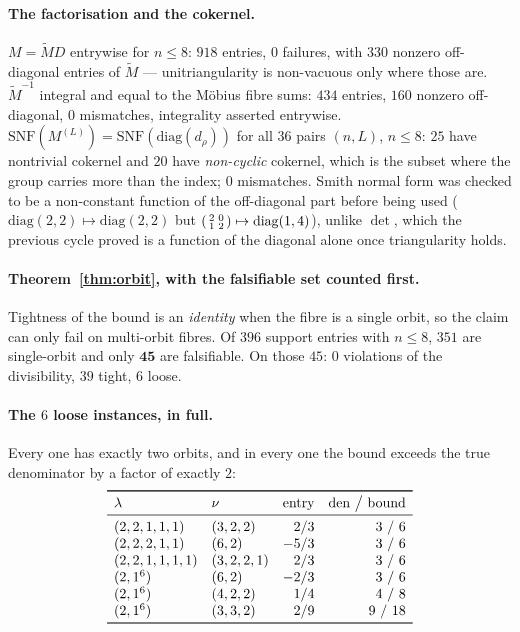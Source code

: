 \documentclass[11pt]{article}
\theoremstyle{definition}
\newcommand{\lam}{\lambda}
\begin{document}
\paragraph{The factorisation and the cokernel.} $M=\widetilde M D$ entrywise for $n\le8$: $918$
entries, $0$ failures, with $330$ nonzero off-diagonal entries of $\widetilde M$ --- unitriangularity
is non-vacuous only where those are. $\widetilde M^{-1}$ integral and equal to the Möbius fibre sums:
$434$ entries, $160$ nonzero off-diagonal, $0$ mismatches, integrality asserted entrywise.
$\mathrm{SNF}(M^{(L)})=\mathrm{SNF}(\mathrm{diag}(d_\rho))$ for all $36$ pairs $(n,L)$, $n\le8$: $25$
have nontrivial cokernel and $20$ have \emph{non-cyclic} cokernel, which is the subset where the
group carries more than the index; $0$ mismatches. Smith normal form was checked to be a non-constant
function of the off-diagonal part before being used
($\mathrm{diag}(2,2)\mapsto\mathrm{diag}(2,2)$ but $\begin{psmallmatrix}2&0\\1&2\end{psmallmatrix}
\mapsto\mathrm{diag}(1,4)$), unlike $\det$, which the previous cycle proved is a function of the
diagonal alone once triangularity holds.

\paragraph{Theorem~\ref{thm:orbit}, with the falsifiable set counted first.} Tightness of the bound is
an \emph{identity} when the fibre is a single orbit, so the claim can only fail on multi-orbit
fibres. Of $396$ support entries with $n\le8$, $351$ are single-orbit and only $\mathbf{45}$ are
falsifiable. On those $45$: $0$ violations of the divisibility, $39$ tight, $6$ loose.

\paragraph{The $6$ loose instances, in full.} Every one has exactly two orbits, and in every one the
bound exceeds the true denominator by a factor of exactly $2$:
\[
\begin{array}{llrr}
\toprule
\lam & \nu & \text{entry} & \text{den}\ \big/\ \text{bound}\\
\midrule
(2,2,1,1,1) & (3,2,2) & 2/3 & 3\ /\ 6\\
(2,2,2,1,1) & (6,2) & -5/3 & 3\ /\ 6\\
(2,2,1,1,1,1) & (3,2,2,1) & 2/3 & 3\ /\ 6\\
(2,1^6) & (6,2) & -2/3 & 3\ /\ 6\\
(2,1^6) & (4,2,2) & 1/4 & 4\ /\ 8\\
(2,1^6) & (3,3,2) & 2/9 & 9\ /\ 18\\
\bottomrule
\end{array}
\]
\end{document}
